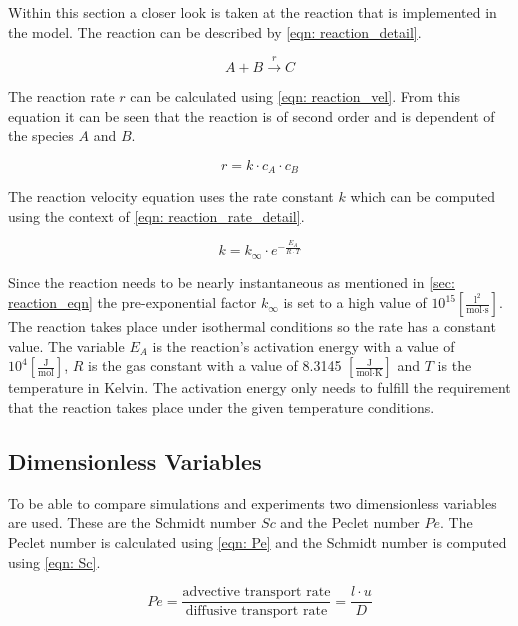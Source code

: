 \documentclass[../thesis.tex]{subfiles}
\begin{document}
Within this section a closer look is taken at the reaction that is implemented in the model. The reaction can be described by \autoref{eqn: reaction_detail}.

\begin{equation}
	\label{eqn: reaction_detail}
	A + B \xrightarrow{r} C
\end{equation}

The reaction rate $r$ can be calculated using \autoref{eqn: reaction_vel}. From this equation it can be seen that the reaction is of second order and is dependent of the species $A$ and $B$.

\begin{equation}
	\label{eqn: reaction_vel}
	r = k \cdot c_A \cdot c_B
\end{equation}

The reaction velocity equation uses the rate constant $k$ which can be computed using the context of \autoref{eqn: reaction_rate_detail}.

\begin{equation}
	\label{eqn: reaction_rate_detail}
	k = k_{\infty} \cdot e^{- \frac{E_A}{R \cdot T}}
\end{equation}

Since the reaction needs to be nearly instantaneous as mentioned in \autoref{sec: reaction_eqn} the pre-exponential factor $k_{\infty}$ is set to a high value of $10^{15} \left[ \frac{\text{l}^2}{\text{mol} \cdot \text{s}} \right] $. The reaction takes place under isothermal conditions so the rate has a constant value. The variable $E_A$ is the reaction's activation energy with a value of $10^4 \left[ \frac{\text{J}}{\text{mol}} \right] $, $R$ is the gas constant with a value of 8.3145 $\left[ \frac{\text{J}}{\text{mol} \cdot \text{K}} \right] $ and $T$ is the temperature in Kelvin. The activation energy only needs to fulfill the requirement that the reaction takes place under the given temperature conditions.

\subsection{Dimensionless Variables}

To be able to compare simulations and experiments two dimensionless variables are used. These are the Schmidt number $Sc$ and the Peclet number $Pe$. The Peclet number is calculated using \autoref{eqn: Pe} and the Schmidt number is computed using \autoref{eqn: Sc}.

\begin{equation}
	\label{eqn: Pe}
	Pe = \dfrac{\text{advective transport rate}}{\text{diffusive transport rate}} =\dfrac{l \cdot u}{D}
\end{equation}
\end{document}
